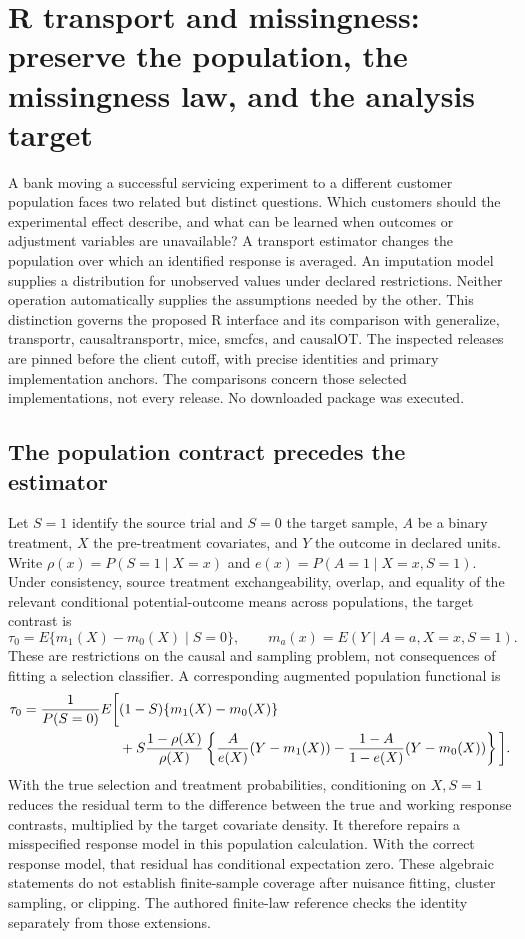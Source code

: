 \section[R transport and missingness contracts]{R transport and missingness: preserve the population, the missingness law, and the analysis target}
\label{sec:exec25-rtm}

A bank moving a successful servicing experiment to a different customer population faces two related but distinct questions. Which customers should the experimental effect describe, and what can be learned when outcomes or adjustment variables are unavailable? A transport estimator changes the population over which an identified response is averaged. An imputation model supplies a distribution for unobserved values under declared restrictions. Neither operation automatically supplies the assumptions needed by the other. This distinction governs the proposed R interface and its comparison with generalize, transportr, causaltransportr, mice, smcfcs, and causalOT. The inspected releases are pinned before the client cutoff, with precise identities and primary implementation anchors. The comparisons concern those selected implementations, not every release. No downloaded package was executed.\citep{exec25_rtm_generalize,exec25_rtm_transportr,exec25_rtm_causaltransportr,exec25_rtm_mice,exec25_rtm_smcfcs,exec25_rtm_causalOT}

\subsection{The population contract precedes the estimator}

Let $S=1$ identify the source trial and $S=0$ the target sample, $A$ be a binary treatment, $X$ the pre-treatment covariates, and $Y$ the outcome in declared units. Write $\rho(x)=P(S=1\mid X=x)$ and $e(x)=P(A=1\mid X=x,S=1)$. Under consistency, source treatment exchangeability, overlap, and equality of the relevant conditional potential-outcome means across populations, the target contrast is
\[
 \tau_0=E\{m_1(X)-m_0(X)\mid S=0\},\qquad
 m_a(x)=E(Y\mid A=a,X=x,S=1).
\]
These are restrictions on the causal and sampling problem, not consequences of fitting a selection classifier. A corresponding augmented population functional is
\begin{align*}
 \tau_0={1\over P(S=0)}E\bigg[&(1-S)\{m_1(X)-m_0(X)\}\\
 &+S{1-\rho(X)\over\rho(X)}
 \left\{{A\over e(X)}(Y-m_1(X))
       -{1-A\over1-e(X)}(Y-m_0(X))\right\}\bigg].
\end{align*}
With the true selection and treatment probabilities, conditioning on $X,S=1$ reduces the residual term to the difference between the true and working response contrasts, multiplied by the target covariate density. It therefore repairs a misspecified response model in this population calculation. With the correct response model, that residual has conditional expectation zero. These algebraic statements do not establish finite-sample coverage after nuisance fitting, cluster sampling, or clipping. The authored finite-law reference checks the identity separately from those extensions.\citep{exec25_rtm_choice}

